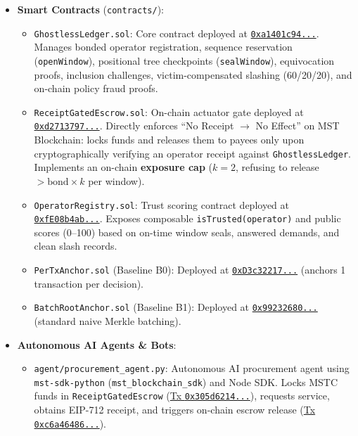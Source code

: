 \documentclass[11pt,a4paper]{article}
\begin{document}
\begin{itemize}[leftmargin=1.5em]
    \item \textbf{Smart Contracts} (\texttt{contracts/}):
    \begin{itemize}
        \item \texttt{GhostlessLedger.sol}: Core contract deployed at \href{https://mstscan.com/address/0xa1401c940e576E8D25aB03b93444c9f19ae52755}{\texttt{0xa1401c94...}}. Manages bonded operator registration, sequence reservation (\texttt{openWindow}), positional tree checkpoints (\texttt{sealWindow}), equivocation proofs, inclusion challenges, victim-compensated slashing (60/20/20), and on-chain policy fraud proofs.
        \item \texttt{ReceiptGatedEscrow.sol}: On-chain actuator gate deployed at \href{https://mstscan.com/address/0xd271379747318248eF16d4BC6F8653Ad0D6726A7}{\texttt{0xd2713797...}}. Directly enforces ``No Receipt $\rightarrow$ No Effect'' on MST Blockchain: locks funds and releases them to payees only upon cryptographically verifying an operator receipt against \texttt{GhostlessLedger}. Implements an on-chain \textbf{exposure cap} ($k=2$, refusing to release $> \text{bond} \times k$ per window).
        \item \texttt{OperatorRegistry.sol}: Trust scoring contract deployed at \href{https://mstscan.com/address/0xfE08b4abBa893d36Ea8006271897B4f9c8348C38}{\texttt{0xfE08b4ab...}}. Exposes composable \texttt{isTrusted(operator)} and public scores (0--100) based on on-time window seals, answered demands, and clean slash records.
        \item \texttt{PerTxAnchor.sol} (Baseline B0): Deployed at \href{https://mstscan.com/address/0xD3c32217661A5679f649E3Dda559bA7B5faEa041}{\texttt{0xD3c32217...}} (anchors 1 transaction per decision).
        \item \texttt{BatchRootAnchor.sol} (Baseline B1): Deployed at \href{https://mstscan.com/address/0x99232680AcD8D8cbACAE2F284f07F0B9B7f4E198}{\texttt{0x99232680...}} (standard naive Merkle batching).
    \end{itemize}
    \item \textbf{Autonomous AI Agents \& Bots}:
    \begin{itemize}
        \item \texttt{agent/procurement\_agent.py}: Autonomous AI procurement agent using \texttt{mst-sdk-python} (\texttt{mst\_blockchain\_sdk}) and Node SDK. Locks MSTC funds in \texttt{ReceiptGatedEscrow} (\href{https://mstscan.com/tx/0x305d62145ac8a1fc23fd49b8e4d731ced7d4ec449243b62ec7a544f15976c6cb}{Tx \texttt{0x305d6214...}}), requests service, obtains EIP-712 receipt, and triggers on-chain escrow release (\href{https://mstscan.com/tx/0xc6a46486bb609f8a3a55f8db3f83987a1d8ef2692de16057b0c5a0d9c5ffb241}{Tx \texttt{0xc6a46486...}}).

\end{itemize}
\end{itemize}
\end{document}
